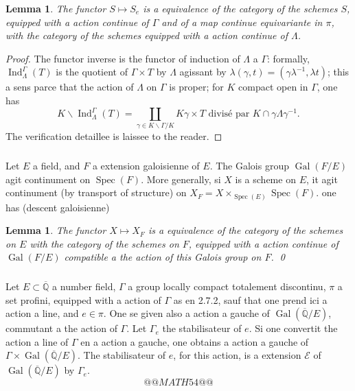 \documentclass[12pt,a4paper]{article}
\theoremstyle{plain}
\newtheorem{lemma}[theorem]{Lemma}
\theoremstyle{definition}
\theoremstyle{remark}
\DeclareMathOperator{\Gal}{Gal}
\DeclareMathOperator{\Spec}{Spec}
\DeclareMathOperator{\Ind}{Ind}
\newcommand{\QQ}{\mathbb{Q}}
\begin{document}
\begin{lemma}
The functor $S \mapsto S_e$ is a equivalence of the category of the schemes $S$, equipped with a action continue of $\Gamma$ and of a map continue equivariante in $\pi$, with the category of the schemes equipped with a action continue of $\Lambda$.
\end{lemma}

\begin{proof}
The functor inverse is the functor of induction of $\Lambda$ a $\Gamma$: formally, $\Ind_\Lambda^\Gamma(T)$ is the quotient of $\Gamma \times T$ by $\Lambda$ agissant by $\lambda(\gamma,t) = (\gamma\lambda^{-1},\lambda t)$; this a sens parce that the action of $\Lambda$ on $\Gamma$ is proper; for $K$ compact open in $\Gamma$, one has
\[
K\backslash\Ind_\Lambda^\Gamma(T) = \coprod_{\gamma \in K\backslash\Gamma/K} K\gamma \times T \text{ divis\'e par } K \cap \gamma\Lambda\gamma^{-1}.
\]
The verification detaillee is laissee to the reader.
\end{proof}

\subsubsection{}

Let $E$ a field, and $F$ a extension galoisienne of $E$. The Galois group $\Gal(F/E)$ agit continument on $\Spec(F)$. More generally, si $X$ is a scheme on $E$, it agit continument (by transport of structure) on $X_F = X \times_{\Spec(E)} \Spec(F)$. one has (descent galoisienne)

\begin{lemma}
The functor $X \mapsto X_F$ is a equivalence of the category of the schemes on $E$ with the category of the schemes on $F$, equipped with a action continue of $\Gal(F/E)$ compatible a the action of this Galois group on $F$.
\qed
\end{lemma}

\subsubsection{}

Let $E \subset \overline{\QQ}$ a number field, $\Gamma$ a group locally compact totalement discontinu, $\pi$ a set profini, equipped with a action of $\Gamma$ as en 2.7.2, sauf that one prend ici a action a line, and $e \in \pi$. One se given also a action a gauche of $\Gal(\overline{\QQ}/E)$, commutant a the action of $\Gamma$. Let $\Gamma_e$ the stabilisateur of $e$. Si one convertit the action a line of $\Gamma$ en a action a gauche, one obtains a action a gauche of $\Gamma \times \Gal(\overline{\QQ}/E)$. The stabilisateur of $e$, for this action, is a extension $\mathscr{E}$ of $\Gal(\overline{\QQ}/E)$ by $\Gamma_e$.
\[
@@MATH54@@
\]
\end{document}
